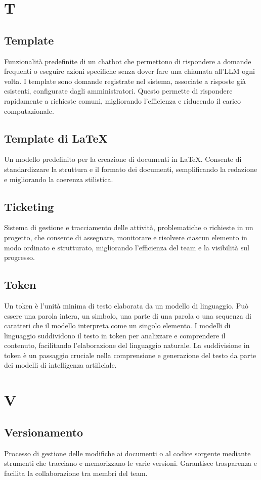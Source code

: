 \documentclass{article}
\begin{document}
\newpage
\section{T}

\subsection{Template}
Funzionalità predefinite di un chatbot che permettono di rispondere a domande frequenti o eseguire azioni specifiche senza dover fare una chiamata all'LLM ogni volta. I template sono domande registrate nel sistema, associate a risposte già esistenti, configurate dagli amministratori. Questo permette di rispondere rapidamente a richieste comuni, migliorando l'efficienza e riducendo il carico computazionale.

\subsection{Template di LaTeX}
Un modello predefinito per la creazione di documenti in LaTeX. Consente di standardizzare la struttura e il formato dei documenti, semplificando la redazione e migliorando la coerenza stilistica.

\subsection{Ticketing}
Sistema di gestione e tracciamento delle attività, problematiche o richieste in un progetto, che consente di assegnare, monitorare e risolvere ciascun elemento in modo ordinato e strutturato, migliorando l'efficienza del team e la visibilità sul progresso.
 
\subsection{Token}
Un token è l'unità minima di testo elaborata da un modello di linguaggio. Può essere una parola intera, un simbolo, una parte di una parola o una sequenza di caratteri che il modello interpreta come un singolo elemento. I modelli di linguaggio suddividono il testo in token per analizzare e comprendere il contenuto, facilitando l'elaborazione del linguaggio naturale. La suddivisione in token è un passaggio cruciale nella comprensione e generazione del testo da parte dei modelli di intelligenza artificiale.
\newpage

\section{V}

\subsection{Versionamento}
Processo di gestione delle modifiche ai documenti o al codice sorgente mediante strumenti che tracciano e memorizzano le varie versioni. Garantisce trasparenza e facilita la collaborazione tra membri del team.
\end{document}
